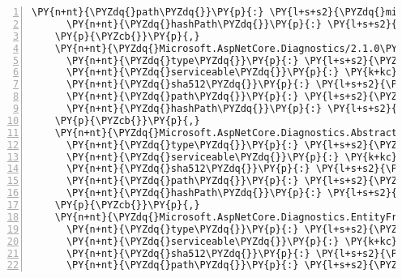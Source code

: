 \begin{Verbatim}[commandchars=\\\{\},numbers=left,firstnumber=1,stepnumber=1,numberblanklines=0]
      \PY{n+nt}{\PYZdq{}path\PYZdq{}}\PY{p}{:} \PY{l+s+s2}{\PYZdq{}microsoft.aspnetcore.dataprotection.extensions/2.1.0\PYZhy{}rc1\PYZhy{}final\PYZdq{}}\PY{p}{,}
      \PY{n+nt}{\PYZdq{}hashPath\PYZdq{}}\PY{p}{:} \PY{l+s+s2}{\PYZdq{}microsoft.aspnetcore.dataprotection.extensions.2.1.0\PYZhy{}rc1\PYZhy{}final.nupkg.sha512\PYZdq{}}
    \PY{p}{\PYZcb{}}\PY{p}{,}
    \PY{n+nt}{\PYZdq{}Microsoft.AspNetCore.Diagnostics/2.1.0\PYZhy{}rc1\PYZhy{}final\PYZdq{}}\PY{p}{:} \PY{p}{\PYZob{}}
      \PY{n+nt}{\PYZdq{}type\PYZdq{}}\PY{p}{:} \PY{l+s+s2}{\PYZdq{}package\PYZdq{}}\PY{p}{,}
      \PY{n+nt}{\PYZdq{}serviceable\PYZdq{}}\PY{p}{:} \PY{k+kc}{true}\PY{p}{,}
      \PY{n+nt}{\PYZdq{}sha512\PYZdq{}}\PY{p}{:} \PY{l+s+s2}{\PYZdq{}sha512\PYZhy{}aOJlDFkcwhf7MA3SXz6VhTJXzCso3SbaJ3FIn/I6VULxbnOeyrPU84oMhhV8ovJQhOiPdhLAKOPF7Foipin2wQ==\PYZdq{}}\PY{p}{,}
      \PY{n+nt}{\PYZdq{}path\PYZdq{}}\PY{p}{:} \PY{l+s+s2}{\PYZdq{}microsoft.aspnetcore.diagnostics/2.1.0\PYZhy{}rc1\PYZhy{}final\PYZdq{}}\PY{p}{,}
      \PY{n+nt}{\PYZdq{}hashPath\PYZdq{}}\PY{p}{:} \PY{l+s+s2}{\PYZdq{}microsoft.aspnetcore.diagnostics.2.1.0\PYZhy{}rc1\PYZhy{}final.nupkg.sha512\PYZdq{}}
    \PY{p}{\PYZcb{}}\PY{p}{,}
    \PY{n+nt}{\PYZdq{}Microsoft.AspNetCore.Diagnostics.Abstractions/2.1.0\PYZhy{}rc1\PYZhy{}final\PYZdq{}}\PY{p}{:} \PY{p}{\PYZob{}}
      \PY{n+nt}{\PYZdq{}type\PYZdq{}}\PY{p}{:} \PY{l+s+s2}{\PYZdq{}package\PYZdq{}}\PY{p}{,}
      \PY{n+nt}{\PYZdq{}serviceable\PYZdq{}}\PY{p}{:} \PY{k+kc}{true}\PY{p}{,}
      \PY{n+nt}{\PYZdq{}sha512\PYZdq{}}\PY{p}{:} \PY{l+s+s2}{\PYZdq{}sha512\PYZhy{}mmGDuYIG9y2QN3N35yKwLHB8u5IkZDE4mEkkfbxuzElO2C9rwRFHGUBBFIq/HhTF7eOzrLkdRKPILcU+2skgMQ==\PYZdq{}}\PY{p}{,}
      \PY{n+nt}{\PYZdq{}path\PYZdq{}}\PY{p}{:} \PY{l+s+s2}{\PYZdq{}microsoft.aspnetcore.diagnostics.abstractions/2.1.0\PYZhy{}rc1\PYZhy{}final\PYZdq{}}\PY{p}{,}
      \PY{n+nt}{\PYZdq{}hashPath\PYZdq{}}\PY{p}{:} \PY{l+s+s2}{\PYZdq{}microsoft.aspnetcore.diagnostics.abstractions.2.1.0\PYZhy{}rc1\PYZhy{}final.nupkg.sha512\PYZdq{}}
    \PY{p}{\PYZcb{}}\PY{p}{,}
    \PY{n+nt}{\PYZdq{}Microsoft.AspNetCore.Diagnostics.EntityFrameworkCore/2.1.0\PYZhy{}rc1\PYZhy{}final\PYZdq{}}\PY{p}{:} \PY{p}{\PYZob{}}
      \PY{n+nt}{\PYZdq{}type\PYZdq{}}\PY{p}{:} \PY{l+s+s2}{\PYZdq{}package\PYZdq{}}\PY{p}{,}
      \PY{n+nt}{\PYZdq{}serviceable\PYZdq{}}\PY{p}{:} \PY{k+kc}{true}\PY{p}{,}
      \PY{n+nt}{\PYZdq{}sha512\PYZdq{}}\PY{p}{:} \PY{l+s+s2}{\PYZdq{}sha512\PYZhy{}9V0W+ZFgaU3i2QcMJ90QMxwdnd9sKpDjzbl7rd4Nvyu4WHLruce+bTXnuZ9zDhCylLQ/ZE6AJQ4M8lYNctFrVA==\PYZdq{}}\PY{p}{,}
      \PY{n+nt}{\PYZdq{}path\PYZdq{}}\PY{p}{:} \PY{l+s+s2}{\PYZdq{}microsoft.aspnetcore.diagnostics.entityframeworkcore/2.1.0\PYZhy{}rc1\PYZhy{}final\PYZdq{}}\PY{p}{,}

\end{Verbatim}
